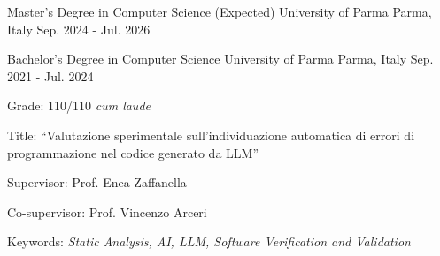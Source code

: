 

\begin{cventries}

    \cventry
    {Master's Degree in Computer Science (Expected)} %
    {University of Parma} %
    {Parma, Italy} %
    {Sep. 2024 - Jul. 2026} %
    {
    }
    \vspace{-4.0mm}

    \cventry
    {Bachelor's Degree in Computer Science} %
    {University of Parma} %
    {Parma, Italy} %
    {Sep. 2021 - Jul. 2024} %
    {
        \begin{cvitems-no-bullet} %
            \item {Grade: 110/110 \emph{cum laude}}
            \item {Title: \textquotedblleft{Valutazione sperimentale sull’individuazione automatica di errori di programmazione nel codice generato da LLM}\textquotedblright}
            \item {Supervisor: Prof. Enea Zaffanella}
            \item {Co-supervisor: Prof. Vincenzo Arceri}
            \item {Keywords: \emph{Static Analysis, AI, LLM, Software Verification and Validation}}
            \end{cvitems-no-bullet}
        }

    \end{cventries}
